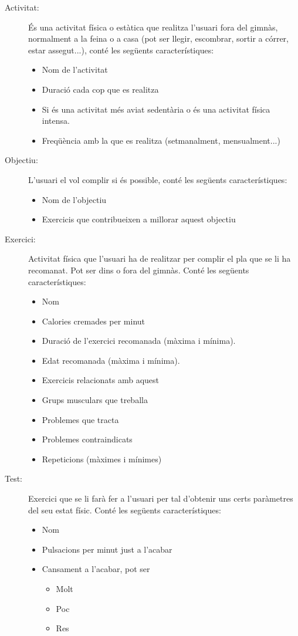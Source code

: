 \documentclass[a4paper, 12pt, UTF8]{article}
\begin{document}
\begin{description}
	\item[Activitat:] És una activitat física o estàtica que realitza l'usuari fora del gimnàs, normalment a la feina o a casa (pot ser llegir, escombrar, sortir a córrer, estar assegut...), conté les següents característiques:
	
	\begin{itemize}
		\item Nom de l'activitat
		\item Duració cada cop que es realitza
		\item Si és una activitat més aviat sedentària o és una activitat física intensa.  
		\item Freqüència amb la que es realitza (setmanalment, mensualment...)
	\end{itemize}
	
	\item[Objectiu:] L'usuari el vol complir si és possible, conté les següents característiques:
	\begin{itemize}
		\item Nom de l'objectiu
		\item Exercicis que contribueixen a millorar aquest objectiu
	\end{itemize}
	
	\item[Exercici:] Activitat física que l'usuari ha de realitzar per complir el pla que se li ha recomanat. Pot ser dins o fora del gimnàs. Conté les següents característiques:
	\begin{itemize}
		\item Nom
		\item Calories cremades per minut
		\item Duració de l'exercici recomanada (màxima i mínima).
		\item Edat recomanada (màxima i mínima).
		\item Exercicis relacionats amb aquest
		\item Grups musculars que treballa
		\item Problemes que tracta
		\item Problemes contraindicats
		\item Repeticions (màximes i mínimes)
	\end{itemize}
	
	\item[Test:] Exercici que se li farà fer a l'usuari per tal d'obtenir uns certs paràmetres del seu estat físic. Conté les següents característiques:
	\begin{itemize}
		\item Nom
		\item Pulsacions per minut just a l'acabar
		\item Cansament a l'acabar, pot ser
		\begin{itemize}
			\item Molt
			\item Poc
			\item Res
		\end{itemize}			
	\end{itemize}
	

\end{description}
\end{document}
